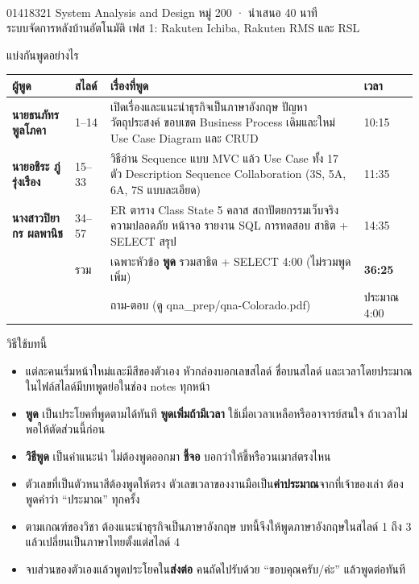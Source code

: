 \documentclass[12pt,a4paper]{article}
\newcommand{\speakerA}{นายธนภัทร พูลโภคา}
\newcommand{\speakerB}{นายอชิระ ภู่รุ่งเรือง}
\newcommand{\speakerC}{นางสาวปิยากร ผลพานิช}
\newcommand{\num}[1]{{\heavy\textcolor{cur}{#1}}}
\newcommand{\q}[1]{{\mono #1}}
\begin{document}

\begin{tcolorbox}[enhanced,colback=ink,colframe=ink,arc=4pt,left=12pt,right=12pt,top=12pt,bottom=12pt]
  \color{white}{\heavy\huge บทพูดนำเสนอ Colorado Back-Office System}\\[4pt]
  {\large 01418321 System Analysis and Design  หมู่ 200  ·  นำเสนอ 40 นาที}\\[2pt]
  {\large ระบบจัดการหลังบ้านอัตโนมัติ เฟส 1: Rakuten Ichiba, Rakuten RMS และ RSL}
\end{tcolorbox}

\vspace{6pt}
{\heavy\Large แบ่งกันพูดอย่างไร}\par
\renewcommand{\arraystretch}{1.5}
\begin{tabularx}{\linewidth}{>{\bfseries}p{4.3cm} p{1.6cm} X p{2.0cm}}
\toprule
ผู้พูด & สไลด์ & เรื่องที่พูด & เวลา\\
\midrule
\textcolor{sA}{\speakerA} & 1--14 & เปิดเรื่องและแนะนำธุรกิจเป็นภาษาอังกฤษ ปัญหา วัตถุประสงค์ ขอบเขต Business Process เดิมและใหม่ Use Case Diagram และ CRUD & 10:15\\
\textcolor{sB}{\speakerB} & 15--33 & วิธีอ่าน Sequence แบบ MVC แล้ว Use Case ทั้ง 17 ตัว Description Sequence Collaboration (3S, 5A, 6A, 7S แบบละเอียด) & 11:35\\
\textcolor{sC}{\speakerC} & 34--57 & ER ตาราง Class State 5 คลาส สถาปัตยกรรมเว็บจริง ความปลอดภัย หน้าจอ รายงาน SQL การทดสอบ สาธิต + SELECT สรุป & 14:35\\
\midrule
 & รวม & เฉพาะหัวข้อ \textbf{พูด} รวมสาธิต + SELECT 4:00 (ไม่รวมพูดเพิ่ม) & \textbf{36:25}\\
 & & ถาม-ตอบ (ดู \q{qna\_prep/qna-Colorado.pdf}) & ประมาณ 4:00\\
\bottomrule
\end{tabularx}

\vspace{4pt}
{\heavy\Large วิธีใช้บทนี้}\par
\begin{itemize}[itemsep=0pt]
  \item แต่ละคนเริ่มหน้าใหม่และมีสีของตัวเอง หัวกล่องบอกเลขสไลด์ ชื่อบนสไลด์ และเวลาโดยประมาณ ในไฟล์สไลด์มีบทพูดย่อในช่อง notes ทุกหน้า
  \item \textbf{พูด} เป็นประโยคที่พูดตามได้ทันที \textbf{พูดเพิ่มถ้ามีเวลา} ใช้เมื่อเวลาเหลือหรืออาจารย์สนใจ ถ้าเวลาไม่พอให้ตัดส่วนนี้ก่อน
  \item \textbf{วิธีพูด} เป็นคำแนะนำ ไม่ต้องพูดออกมา \textbf{ชี้จอ} บอกว่าให้ชี้หรือวนเมาส์ตรงไหน
  \item ตัวเลขที่เป็น\num{ตัวหนาสี}ต้องพูดให้ตรง ตัวเลขเวลาของงานมือเป็น\textbf{ค่าประมาณ}จากที่เจ้าของเล่า ต้องพูดคำว่า ``ประมาณ'' ทุกครั้ง
  \item ตามเกณฑ์ของวิชา ต้องแนะนำธุรกิจเป็นภาษาอังกฤษ บทนี้จึงให้พูดภาษาอังกฤษในสไลด์ 1 ถึง 3 แล้วเปลี่ยนเป็นภาษาไทยตั้งแต่สไลด์ 4
  \item จบส่วนของตัวเองแล้วพูดประโยคใน\textbf{ส่งต่อ} คนถัดไปรับด้วย ``ขอบคุณครับ/ค่ะ'' แล้วพูดต่อทันที
\end{itemize}
\end{document}
